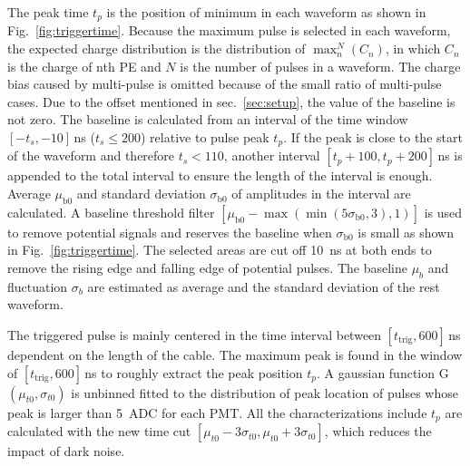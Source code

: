 The peak time $t_p$ is the position of minimum in each waveform as shown in Fig.~\ref{fig:triggertime}. Because the maximum pulse is selected in each waveform, the expected charge distribution is the distribution of $\max_n^N(C_n)$, in which $C_n$ is the charge of nth PE and $N$ is the number of pulses in a waveform. The charge bias caused by multi-pulse is omitted because of the small ratio of multi-pulse cases. Due to the offset mentioned in sec.~\ref{sec:setup}, the value of the baseline is not zero. The baseline is calculated from an interval of the time window $[-t_s,-10]$\,ns ($t_s\leq200$) relative to pulse peak $t_p$. If the peak is close to the start of the waveform and therefore $t_s < 110$, another interval $[t_p+100,t_p+200]$\,ns is appended to the total interval to ensure the length of the interval is enough. Average $\mu_{\mathrm{b0}}$ and standard deviation $\sigma_{\mathrm{b0}}$ of amplitudes in the interval are calculated. A baseline threshold filter $[\mu_{\mathrm{b0}}-\max(\min(5\sigma_{\mathrm{b0}},3),1)]$ is used to remove potential signals and reserves the baseline when $\sigma_{\mathrm{b0}}$ is small as shown in Fig.~\ref{fig:triggertime}. The selected areas are cut off \SI{10}{ns} at both ends to remove the rising edge and falling edge of potential pulses. The baseline $\mu_b$ and fluctuation $\sigma_b$ are estimated as average and the standard deviation of the rest waveform.

The triggered pulse is mainly centered in the time interval between $[t_{\mathrm{trig}}, 600]$\,ns dependent on the length of the cable. The maximum peak is found in the window of $[t_{\mathrm{trig}}, 600]$\,ns to roughly extract the peak position $t_p$. A gaussian function G$(\mu_{t0},\sigma_{t0})$ is unbinned fitted to the distribution of peak location of pulses whose peak is larger than \SI{5}{ADC} for each PMT. %
 All the characterizations include $t_p$ are calculated with the new time cut $[\mu_{t0}-3\sigma_{t0}, \mu_{t0}+3\sigma_{t0}]$, which reduces the impact of dark noise.


